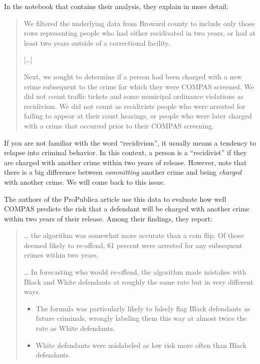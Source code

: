 In the notebook that contains their analysis, they explain in more
detail:

\begin{quote}
We filtered the underlying data from Broward county to include only
those rows representing people who had either recidivated in two years,
or had at least two years outside of a correctional facility.

{[}\ldots{]}

Next, we sought to determine if a person had been charged with a new
crime subsequent to the crime for which they were COMPAS screened. We
did not count traffic tickets and some municipal ordinance violations as
recidivism. We did not count as recidivists people who were arrested for
failing to appear at their court hearings, or people who were later
charged with a crime that occurred prior to their COMPAS screening.
\end{quote}

If you are not familiar with the word ``recidivism'', it usually means a
tendency to relapse into criminal behavior. In this context, a person is
a ``recidivist'' if they are charged with another crime within two years
of release. However, note that there is a big difference between
\emph{committing} another crime and being \emph{charged} with another
crime. We will come back to this issue.

The authors of the ProPublica article use this data to evaluate how well
COMPAS predicts the risk that a defendant will be charged with another
crime within two years of their release. Among their findings, they
report:

\begin{quote}
\ldots{} the algorithm was somewhat more accurate than a coin flip. Of
those deemed likely to re-offend, 61 percent were arrested for any
subsequent crimes within two years.

\ldots{} In forecasting who would re-offend, the algorithm made mistakes
with Black and White defendants at roughly the same rate but in very
different ways.

\begin{itemize}
\item
  The formula was particularly likely to falsely flag Black defendants
  as future criminals, wrongly labeling them this way at almost twice
  the rate as White defendants.
\item
  White defendants were mislabeled as low risk more often than Black
  defendants.
\end{itemize}
\end{quote}

